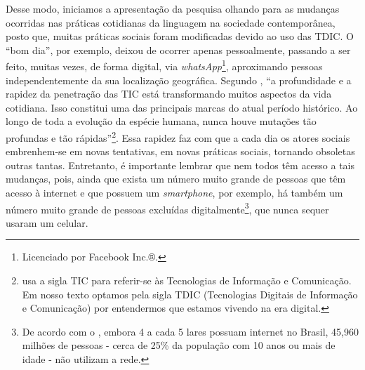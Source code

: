 \documentclass{textolivre}
\begin{document}
Desse modo, iniciamos a apresentação da pesquisa olhando para as mudanças ocorridas nas práticas cotidianas da linguagem na sociedade contemporânea, posto que, muitas práticas sociais foram modificadas devido ao uso das TDIC. O “bom dia”, por exemplo, deixou de ocorrer apenas pessoalmente, passando a ser feito, muitas vezes, de forma digital, via \emph{whatsApp}\footnote{Licenciado por Facebook Inc.®.}, aproximando pessoas independentemente da sua localização geográfica. Segundo \textcite[p.~17]{assmann2001}, “a profundidade e a rapidez da penetração das TIC está transformando muitos aspectos da vida cotidiana. Isso constitui uma das principais marcas do atual período histórico. Ao longo de toda a evolução da espécie humana, nunca houve mutações tão profundas e tão rápidas”\footnote{\textcite{assmann2001} usa a sigla TIC para referir-se às Tecnologias de Informação e Comunicação. Em nosso texto optamos pela sigla TDIC (Tecnologias Digitais de Informação e Comunicação) por entendermos que estamos vivendo na era digital.}. Essa rapidez faz com que a cada dia os atores sociais embrenhem-se em novas tentativas, em novas práticas sociais, tornando obsoletas outras tantas. Entretanto, é importante lembrar que nem todos têm acesso a tais mudanças, pois, ainda que exista um número muito grande de pessoas que têm acesso à internet e que possuem um \emph{smartphone}, por exemplo, há também um número muito grande de pessoas excluídas digitalmente\footnote{De acordo com o \textcite{ibge2018}, embora 4 a cada 5 lares possuam internet no Brasil, 45,960 milhões de pessoas - cerca de 25\% da população com 10 anos ou mais de idade - não utilizam a rede. }, que nunca sequer usaram um celular.
\end{document}

